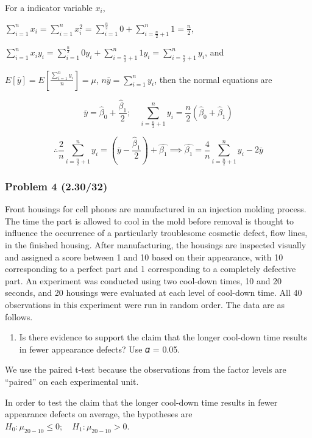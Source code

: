 \documentclass[]{article}
\providecommand{\tightlist}{%
  \setlength{\itemsep}{0pt}\setlength{\parskip}{0pt}}
\begin{document}
For a indicator variable \(x_i\),

\(\sum_{i=1}^nx_i=\sum_{i=1}^nx_i^2=\sum_{i=1}^{\frac{n}2}0+\sum_{i=\frac{n}2+1}^n1=\frac{n}2\),

\(\sum_{i=1}^nx_iy_i=\sum_{i=1}^{\frac{n}2}0y_i+\sum_{i=\frac{n}2+1}^n1y_i=\sum_{i=\frac{n}2+1}^ny_i\),
and

\(E[\bar y]=E[\frac{\sum_{i=1}^ny_i}n]=\mu\),
\(n\bar y=\sum_{i=1}^ny_i\), then the normal equations are

\[\bar y= \hat\beta_0+\frac{\hat\beta_1}2;\quad \sum_{i=\frac{n}2+1}^ny_i=\frac{n}2(\hat\beta_0+\hat\beta_1)\]

\[\therefore\frac2n\sum_{i=\frac{n}2+1}^ny_i=(\bar y-\frac{\hat\beta_1}2)+\hat{\beta_1}\implies\hat{\beta_1}=\frac4n\sum_{i=\frac{n}2+1}^ny_i-2\bar y\]

\hypertarget{problem-4-2.3032}{%
\subsubsection{Problem 4 (2.30/32)}\label{problem-4-2.3032}}

Front housings for cell phones are manufactured in an injection molding
process. The time the part is allowed to cool in the mold before removal
is thought to influence the occurrence of a particularly troublesome
cosmetic defect, flow lines, in the finished housing. After
manufacturing, the housings are inspected visually and assigned a score
between 1 and 10 based on their appearance, with 10 corresponding to a
perfect part and 1 corresponding to a completely defective part. An
experiment was conducted using two cool-down times, 10 and 20 seconds,
and 20 housings were evaluated at each level of cool-down time. All 40
observations in this experiment were run in random order. The data are
as follows.

\begin{enumerate}
\def\labelenumi{(\alph{enumi})}
\tightlist
\item
  Is there evidence to support the claim that the longer cool-down time
  results in fewer appearance defects? Use 𝛼 = 0.05.
\end{enumerate}

We use the paired t-test because the observations from the factor levels
are ``paired'' on each experimental unit.

In order to test the claim that the longer cool-down time results in
fewer appearance defects on average, the hypotheses are
\(H_0:\mu_{20-10}\le0;\quad H_1:\mu_{20-10}>0\).
\end{document}
